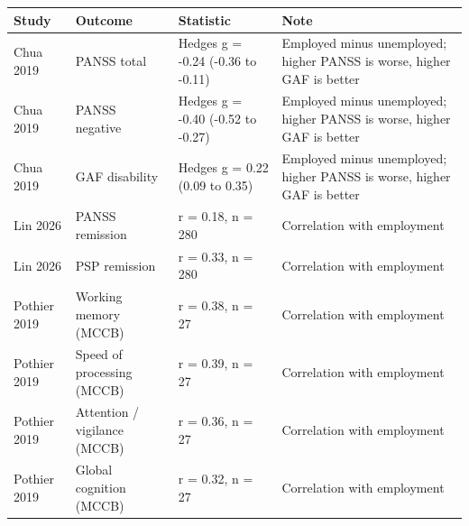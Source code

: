 
\begin{tabular}{llp{5cm}p{5.5cm}}
\toprule
Study & Outcome & Statistic & Note\\
\midrule
Chua 2019 & PANSS total & Hedges g = -0.24 (-0.36 to -0.11) & Employed minus unemployed; higher PANSS is worse, higher GAF is better\\
Chua 2019 & PANSS negative & Hedges g = -0.40 (-0.52 to -0.27) & Employed minus unemployed; higher PANSS is worse, higher GAF is better\\
Chua 2019 & GAF disability & Hedges g = 0.22 (0.09 to 0.35) & Employed minus unemployed; higher PANSS is worse, higher GAF is better\\
Lin 2026 & PANSS remission & r = 0.18, n = 280 & Correlation with employment\\
Lin 2026 & PSP remission & r = 0.33, n = 280 & Correlation with employment\\
Pothier 2019 & Working memory (MCCB) & r = 0.38, n = 27 & Correlation with employment\\
Pothier 2019 & Speed of processing (MCCB) & r = 0.39, n = 27 & Correlation with employment\\
Pothier 2019 & Attention / vigilance (MCCB) & r = 0.36, n = 27 & Correlation with employment\\
Pothier 2019 & Global cognition (MCCB) & r = 0.32, n = 27 & Correlation with employment\\
\bottomrule
\end{tabular}
